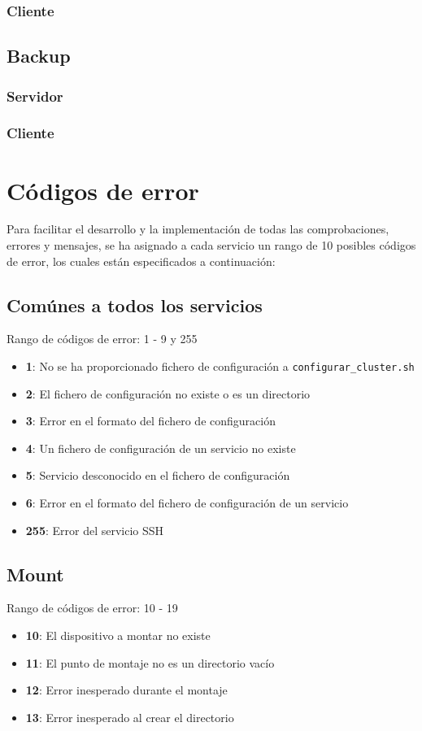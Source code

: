\documentclass[12pt,a4paper, spanish]{article}
\begin{document}
\subsubsection{Cliente}

\subsection{Backup}
\subsubsection{Servidor}
\subsubsection{Cliente}


\newpage
\section{Códigos de error}
Para facilitar el desarrollo y la implementación de todas las comprobaciones, errores y mensajes, se ha asignado a cada servicio un rango de 10 posibles códigos de error, los cuales están especificados a continuación:

\subsection{Comúnes a todos los servicios}
Rango de códigos de error: 1 - 9 y 255
\begin{itemize}
\item \textbf{1}: No se ha proporcionado fichero de configuración a \texttt{configurar\_cluster.sh}
\item \textbf{2}: El fichero de configuración no existe o es un directorio
\item \textbf{3}: Error en el formato del fichero de configuración
\item \textbf{4}: Un fichero de configuración de un servicio no existe
\item \textbf{5}: Servicio desconocido en el fichero de configuración
\item \textbf{6}: Error en el formato del fichero de configuración de un servicio
\item \textbf{255}: Error del servicio SSH
\end{itemize}

\subsection{Mount}
Rango de códigos de error: 10 - 19
\begin{itemize}
\item \textbf{10}: El dispositivo a montar no existe
\item \textbf{11}: El punto de montaje no es un directorio vacío
\item \textbf{12}: Error inesperado durante el montaje
\item \textbf{13}: Error inesperado al crear el directorio
\end{itemize}
\end{document}
